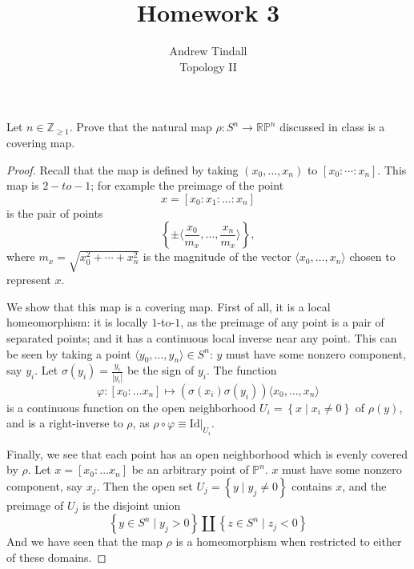 \documentclass[12pt]{article}
\newcommand{\Z}{\mathbb{Z}}
\newcommand{\R}{\mathbb{R}}
\theoremstyle{definition}
\newenvironment{problem}[2][Problem]{\begin{trivlist}
\item[\hskip \labelsep {\bfseries #1}\hskip \labelsep {\bfseries #2.}]}{\end{trivlist}}
\begin{document}
 
 
\title{Homework 3}
\author{Andrew Tindall\\
Topology II}
 
\maketitle
\begin{problem}{1}
    Let $n \in \Z_{\geq 1}$. Prove that the natural map $\rho:S^n \to \R\mathbb P^n$ discussed in class is a covering map. 
    \begin{proof}
	    Recall that the map is defined by taking $(x_0, \dots, x_n)$ to $[x_0:\cdots :x_n]$. This map is $2-to-1$; for example the preimage of the point
	     \[ x = [x_0 : x_1 : \dots : x_n]\] is the pair of points
         \[\left\{ \pm \langle\frac{x_0}{m_x}, \dots , \frac{x_n}{m_x}\rangle \right\},\]
         where $m_x = \sqrt{x_0^2+\cdots+x_n^2}$ is the magnitude of the vector $\langle x_0, \dots , x_n\rangle$ chosen to represent $x$. 
         \par We show that this map is a covering map. First of all, it is a local homeomorphism: it is locally $1$-to-$1$, as the preimage of any point is a pair of separated points; and it has a continuous local inverse near any point. This can be seen by taking a point $\langle y_0, \dots , y_n\rangle \in S^n$: $y$ must have some nonzero component, say $y_i$. Let $\sigma(y_i) = \frac{y_i}{\left \lvert { y_i } \right \lvert }$ be the sign of $y_i$. The function 
         \[\varphi: [x_0:\dots x_n] \mapsto (\sigma(x_i)\sigma(y_i))\langle x_0, \dots , x_n\rangle\]
         is a continuous function on the open neighborhood $U_i = \left\{ x \mid x_i \neq 0 \right\}$ of $\rho(y)$, and is a right-inverse to $\rho$, as $\rho \circ \varphi \equiv \text{Id}\lvert_{U_i}$.
 \par Finally, we see that each point has an open neighborhood which is evenly covered by $\rho$. Let $x = [x_0:\dots x_n]$ be an arbitrary point of $\mathbb P^n$. $x$ must have some nonzero component, say $x_j$. Then the open set $U_j = \left\{ y \mid y_j \neq 0 \right\}$ contains $x$, and the preimage of $U_j$ is the disjoint union 
 \[\left\{ y \in S^n \mid y_j>0 \right\} \coprod \left\{ z \in S^n \mid z_j < 0 \right\}\]
 And we have seen that the map $\rho$ is a homeomorphism when restricted to either of these domains.
    \end{proof}
\end{problem}
\end{document}
